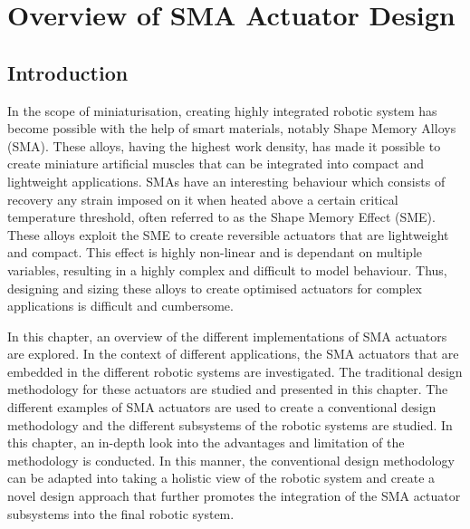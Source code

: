 \chapter{Overview of SMA Actuator Design}\label{chap:sma-actuator-design}
\section{Introduction}
In the scope of miniaturisation, creating highly integrated robotic system has become possible with the help of smart materials, notably Shape Memory Alloys (SMA). These alloys, having the highest work density, has made it possible to create miniature artificial muscles that can be integrated into compact and lightweight applications. SMAs have an interesting behaviour which consists of recovery any strain imposed on it when heated above a certain critical temperature threshold, often referred to as the Shape Memory Effect (SME). These alloys exploit the SME to create reversible actuators that are lightweight and compact. This effect is highly non-linear and is dependant on multiple variables, resulting in a highly complex and difficult to model behaviour. Thus, designing and sizing these alloys to create optimised actuators for complex applications is difficult and cumbersome.

In this chapter, an overview of the different implementations of SMA actuators are explored. In the context of different applications, the SMA actuators that are embedded in the different robotic systems are investigated. The traditional design methodology for these actuators are studied and presented in this chapter. The different examples of SMA actuators are used to create a conventional design methodology and the different subsystems of the robotic systems are studied. In this chapter, an in-depth look into the advantages and limitation of the methodology is conducted. In this manner, the conventional design methodology can be adapted into taking a holistic view of the robotic system and create a novel design approach that further promotes the integration of the SMA actuator subsystems into the final robotic system.


